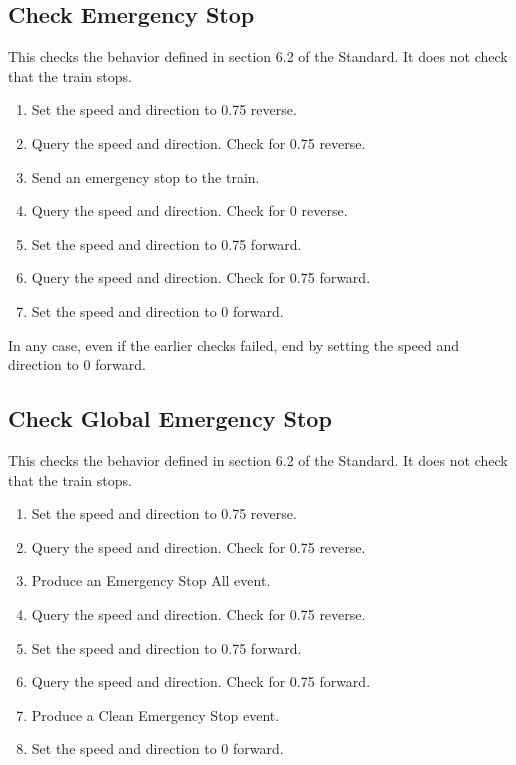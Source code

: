 \subsection{Check Emergency Stop}

This checks the behavior defined in section 6.2 of the Standard.
It does not check that the train stops.

\begin{enumerate}

    \item Set the speed and direction to 0.75 reverse.

    \item Query the speed and direction. Check for 0.75 reverse.

    \item Send an emergency stop to the train.

    \item Query the speed and direction. Check for 0 reverse.

    \item Set the speed and direction to 0.75 forward.

    \item Query the speed and direction. Check for 0.75 forward.

    \item Set the speed and direction to 0 forward.

\end{enumerate}

In any case, even if the earlier checks failed, end by setting the speed 
and direction to 0 forward.

\subsection{Check Global Emergency Stop}

This checks the behavior defined in section 6.2 of the Standard.
It does not check that the train stops.

\begin{enumerate}

    \item Set the speed and direction to 0.75 reverse.

    \item Query the speed and direction. Check for 0.75 reverse.

    \item Produce an Emergency Stop All event.

    \item Query the speed and direction. Check for 0.75 reverse.

    \item Set the speed and direction to 0.75 forward.

    \item Query the speed and direction. Check for 0.75 forward.

    \item Produce a Clean Emergency Stop event.
    
    \item Set the speed and direction to 0 forward.

\end{enumerate}

